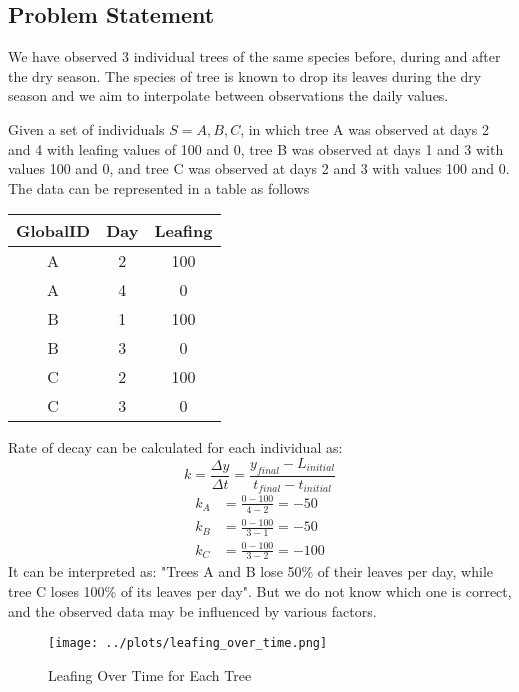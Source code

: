 \documentclass{article}
\begin{document}
\subsection{Problem Statement}

We have observed 3 individual trees of the same species before, during and after the dry season.
The species of tree is known to drop its leaves during the dry season and we aim to interpolate between observations the daily values.

Given a set of individuals $S={A,B,C}$, in which tree A was observed at days 2 and 4 with leafing values of 100 and 0, tree B was observed at days 1 and 3 with values 100 and 0, and tree C was observed at days 2 and 3 with values 100 and 0.
The data can be represented in a table as follows

\begin{table}[h]
    \centering
    \begin{tabular}{|c|c|c|}
        \hline
        GlobalID & Day & Leafing \\
        \hline
        A & 2 & 100 \\
        A & 4 & 0 \\
        B & 1 & 100 \\
        B & 3 & 0 \\
        C & 2 & 100 \\
        C & 3 & 0 \\
        \hline
    \end{tabular}
\end{table}

Rate of decay can be calculated for each individual as:
\begin{equation}
    k= \frac{\Delta y}{\Delta t} = \frac{y_{final} - L_{initial}}{t_{final} - t_{initial}}
\end{equation}
\begin{align}
    k_A &= \frac{0 - 100}{4 - 2} = -50 \\
    k_B &= \frac{0 - 100}{3 - 1} = -50 \\
    k_C &= \frac{0 - 100}{3 - 2} = -100
\end{align}
It can be interpreted as: "Trees A and B lose 50\% of their leaves per day, while tree C loses 100\% of its leaves per day".
But we do not know which one is correct, and the observed data may be influenced by various factors.

\begin{figure}[h]
    \centering
    \texttt{[image: ../plots/leafing\_over\_time.png]}
    \caption{Leafing Over Time for Each Tree}
\end{figure}
\end{document}
